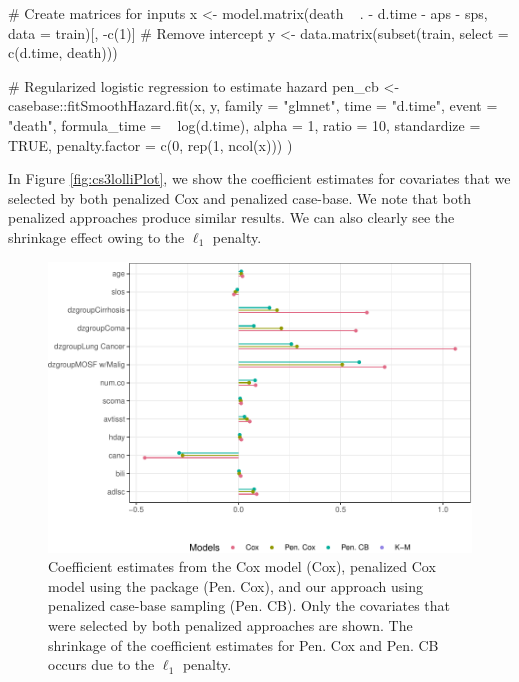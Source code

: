\begin{Schunk}
\begin{Sinput}
# Create matrices for inputs
x <- model.matrix(death ~ . - d.time - aps - sps, 
                  data = train)[, -c(1)] # Remove intercept
y <- data.matrix(subset(train, select = c(d.time, death)))

# Regularized logistic regression to estimate hazard
pen_cb <- casebase::fitSmoothHazard.fit(x, y,
  family = "glmnet",
  time = "d.time", event = "death",
  formula_time = ~ log(d.time), alpha = 1,
  ratio = 10, standardize = TRUE,
  penalty.factor = c(0, rep(1, ncol(x)))
)
\end{Sinput}
\end{Schunk}

In Figure \ref{fig:cs3lolliPlot}, we show the coefficient estimates for
covariates that we selected by both penalized Cox and penalized
case-base. We note that both penalized approaches produce similar
results. We can also clearly see the shrinkage effect owing to the
\(\ell_1\) penalty.

\begin{Schunk}
\begin{figure}[ht]
\includegraphics[width=\textwidth,keepaspectratio=true]{./coefplots-1} \caption{\label{fig:cs3lolliPlot} Coefficient estimates from the Cox model (Cox), penalized Cox model using the  package (Pen. Cox), and our approach using penalized case-base sampling (Pen. CB). Only the covariates that were selected by both penalized approaches are shown. The shrinkage of the coefficient estimates for Pen. Cox and Pen. CB occurs due to the $\ell_1$ penalty.}\label{fig:coefplots}
\end{figure}
\end{Schunk}

